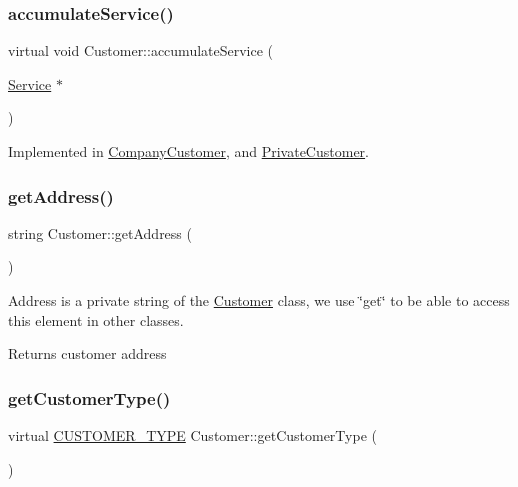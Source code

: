 \subsubsection{\texorpdfstring{accumulate\+Service()}{accumulateService()}}
{\footnotesize\ttfamily virtual void Customer\+::accumulate\+Service (\begin{DoxyParamCaption}\item[{\hyperlink{classService}{Service} $\ast$}]{ }\end{DoxyParamCaption})\hspace{0.3cm}{\ttfamily [pure virtual]}}



Implemented in \hyperlink{classCompanyCustomer_a904197ef9475d4309ac41cc54a2ae5a3}{Company\+Customer}, and \hyperlink{classPrivateCustomer_a22e7d589398c26ac37973660f6e6f338}{Private\+Customer}.

\hypertarget{classCustomer_aebd5a3862a90a21ec56198a69dbe7f34}{}\label{classCustomer_aebd5a3862a90a21ec56198a69dbe7f34} 
\subsubsection{\texorpdfstring{get\+Address()}{getAddress()}}
{\footnotesize\ttfamily string Customer\+::get\+Address (\begin{DoxyParamCaption}{ }\end{DoxyParamCaption})}

Address is a private string of the \hyperlink{classCustomer}{Customer} class, we use \char`\"{}get\char`\"{} to be able to access this element in other classes. \begin{DoxyReturn}{Returns}
customer address 
\end{DoxyReturn}
\hypertarget{classCustomer_a0353fcbdcb8ec729d95e9086df828e34}{}\label{classCustomer_a0353fcbdcb8ec729d95e9086df828e34} 
\subsubsection{\texorpdfstring{get\+Customer\+Type()}{getCustomerType()}}
{\footnotesize\ttfamily virtual \hyperlink{classCustomer_adf157cb713398bb38163743659ec3049}{C\+U\+S\+T\+O\+M\+E\+R\+\_\+\+T\+Y\+PE} Customer\+::get\+Customer\+Type (\begin{DoxyParamCaption}{ }\end{DoxyParamCaption})\hspace{0.3cm}{\ttfamily [pure virtual]}}



